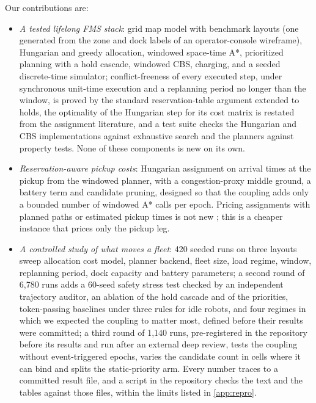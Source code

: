 Our contributions are:
\begin{itemize}
  \item \emph{A tested lifelong FMS stack}: grid map model with benchmark
  layouts (one generated from the zone and dock labels of an operator-console
  wireframe), Hungarian and greedy allocation, windowed space-time A*,
  prioritized planning with a hold cascade, windowed CBS, charging, and a
  seeded discrete-time simulator; conflict-freeness of every executed step,
  under synchronous unit-time execution and a replanning period no longer than
  the window, is proved by the standard reservation-table argument extended to holds, the
  optimality of the Hungarian step for its cost matrix is restated from the
  assignment literature, and a test suite checks the
  Hungarian and CBS implementations against exhaustive search and the planners
  against property tests. None of these components is new on its own.
  \item \emph{Reservation-aware pickup costs}: Hungarian assignment on
  arrival times at the pickup from the windowed planner, with a
  congestion-proxy middle ground, a battery term and candidate pruning,
  designed so that the coupling adds only a bounded number of windowed A*
  calls per epoch. Pricing assignments with planned paths or estimated pickup times is not
  new \citep{shimokawa2022improvement,chen2021integrated,hirayama2026detour}; this is a cheaper instance
  that prices only the pickup leg.
  \item \emph{A controlled study of what moves a fleet}: 420 seeded runs on
  three layouts sweep allocation cost model, planner backend, fleet size,
  load regime, window, replanning period, dock capacity and battery
  parameters; a second round of 6{,}780 runs adds a 60-seed safety stress
  test checked by an independent trajectory auditor, an ablation of the hold
  cascade and of the priorities, token-passing baselines under three rules
  for idle robots, and four regimes
  in which we expected the coupling to matter most, defined before their
  results were committed; a third round of 1{,}140 runs, pre-registered in the
  repository before its results and run after an external deep review, tests
  the coupling without event-triggered epochs, varies the candidate count in
  cells where it can bind and splits the static-priority arm. Every number traces to a
  committed result file, and a script in the repository checks the text and
  the tables against those files, within the limits listed in \cref{app:repro}.
\end{itemize}

